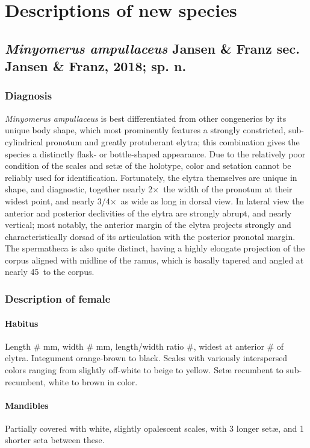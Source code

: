 \documentclass[fleqn,10pt,lineno]{wlpeerj} %
\newcommand{\td}{\textdegree~}
\newcommand{\x}{$\times$~}
\begin{document}
\section*{Descriptions of new species}
	\subsection*{\textit{Minyomerus ampullaceus} Jansen \& Franz sec. Jansen \& Franz, 2018; sp. n.}
		\subsubsection*{Diagnosis}
			\textit{Minyomerus ampullaceus} is best differentiated from other congenerics by its unique body shape, which most prominently features a strongly constricted, sub-cylindrical pronotum and greatly protuberant elytra; this combination gives the species a distinctly flask- or bottle-shaped appearance.
			Due to the relatively poor condition of the scales and set{\ae} of the holotype, color and setation cannot be reliably used for identification.
			Fortunately, the elytra themselves are unique in shape, and diagnostic, together nearly 2\x the width of the pronotum at their widest point, and nearly 3/4\x as wide as long in dorsal view.
			In lateral view the anterior and posterior declivities of the elytra are strongly abrupt, and nearly vertical; most notably, the anterior margin of the elytra projects strongly and characteristically dorsad of its articulation with the posterior pronotal margin.
			The spermatheca is also quite distinct, having a highly elongate projection of the corpus aligned with midline of the ramus, which is basally tapered and angled at nearly 45\td to the corpus.
		\subsubsection*{Description of female}
			\paragraph{Habitus}
				Length \# mm, width \# mm, length/width ratio \#, widest at anterior \# of elytra.
				Integument orange-brown to black. 
				Scales with variously interspersed colors ranging from slightly off-white to beige to yellow. 
				Set{\ae} recumbent to sub-recumbent, white to brown in color.
			\paragraph{Mandibles}
				Partially covered with white, slightly opalescent scales, with 3 longer set{\ae}, and 1 shorter seta between these.
\end{document}
